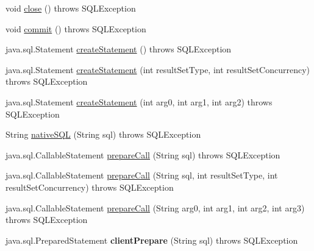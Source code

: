\begin{DoxyCompactItemize}
void \mbox{\hyperlink{classcom_1_1mysql_1_1jdbc_1_1jdbc2_1_1optional_1_1_connection_wrapper_a273eb07d1110be957702fa80230e3b5d}{close}} ()  throws S\+Q\+L\+Exception 
\item 
void \mbox{\hyperlink{classcom_1_1mysql_1_1jdbc_1_1jdbc2_1_1optional_1_1_connection_wrapper_a2765c010785f1fc2cbed1ac07c28a577}{commit}} ()  throws S\+Q\+L\+Exception 
\item 
java.\+sql.\+Statement \mbox{\hyperlink{classcom_1_1mysql_1_1jdbc_1_1jdbc2_1_1optional_1_1_connection_wrapper_ac6aae5147665c76090f38824b803b8f5}{create\+Statement}} ()  throws S\+Q\+L\+Exception 
\item 
java.\+sql.\+Statement \mbox{\hyperlink{classcom_1_1mysql_1_1jdbc_1_1jdbc2_1_1optional_1_1_connection_wrapper_a8e4b2872dce968661546b501281b2639}{create\+Statement}} (int result\+Set\+Type, int result\+Set\+Concurrency)  throws S\+Q\+L\+Exception 
\item 
java.\+sql.\+Statement \mbox{\hyperlink{classcom_1_1mysql_1_1jdbc_1_1jdbc2_1_1optional_1_1_connection_wrapper_a6ac78197446ec43a108c5f6bd66fa1e1}{create\+Statement}} (int arg0, int arg1, int arg2)  throws S\+Q\+L\+Exception 
\item 
String \mbox{\hyperlink{classcom_1_1mysql_1_1jdbc_1_1jdbc2_1_1optional_1_1_connection_wrapper_af2f01a1bf033b05483c9fae385306891}{native\+S\+QL}} (String sql)  throws S\+Q\+L\+Exception 
\item 
java.\+sql.\+Callable\+Statement \mbox{\hyperlink{classcom_1_1mysql_1_1jdbc_1_1jdbc2_1_1optional_1_1_connection_wrapper_ad32af1f66560d8d0ee1c74ad1e615c25}{prepare\+Call}} (String sql)  throws S\+Q\+L\+Exception 
\item 
java.\+sql.\+Callable\+Statement \mbox{\hyperlink{classcom_1_1mysql_1_1jdbc_1_1jdbc2_1_1optional_1_1_connection_wrapper_ab4b7714e34588d9bd35965b104481ff0}{prepare\+Call}} (String sql, int result\+Set\+Type, int result\+Set\+Concurrency)  throws S\+Q\+L\+Exception 
\item 
java.\+sql.\+Callable\+Statement \mbox{\hyperlink{classcom_1_1mysql_1_1jdbc_1_1jdbc2_1_1optional_1_1_connection_wrapper_a05befb9e457e44fc14ae4133068b8a85}{prepare\+Call}} (String arg0, int arg1, int arg2, int arg3)  throws S\+Q\+L\+Exception 
\item 
\mbox{\label{classcom_1_1mysql_1_1jdbc_1_1jdbc2_1_1optional_1_1_connection_wrapper_aad6998019454dc55af04370f9b7db30a}} 
java.\+sql.\+Prepared\+Statement {\bfseries client\+Prepare} (String sql)  throws S\+Q\+L\+Exception 

\end{DoxyCompactItemize}
